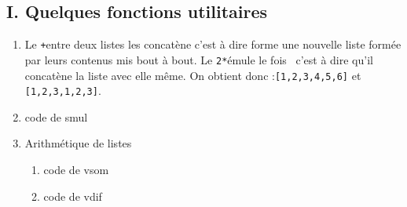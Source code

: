 \subsection*{I. Quelques fonctions utilitaires}
\begin{enumerate}
  \item Le \og \texttt{+}\fg entre deux listes les concatène c'est à dire forme une nouvelle liste formée par leurs contenus mis bout à bout. Le \og\texttt{2*}\fg émule le  fois\fg~ c'est à dire qu'il concatène la liste avec elle même. On obtient donc :\texttt{[1,2,3,4,5,6]} et \texttt{[1,2,3,1,2,3]}.
  \item code de smul 
  \item Arithmétique de listes
\begin{enumerate}
  \item code de vsom 
  \item code de vdif 
\end{enumerate}
\end{enumerate}

